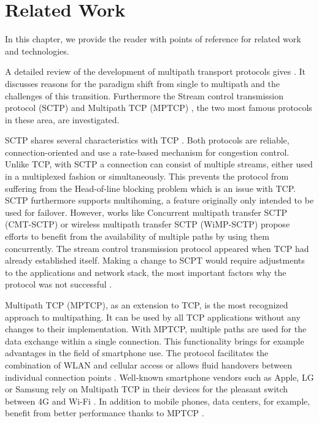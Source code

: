 \chapter{Related Work}
\label{chap:RelatedWork}

In this chapter, we provide the reader with points of reference for related work and technologies. %

A detailed review of the development of multipath transport protocols gives \cite{MultiPathSurvey}. It discusses reasons for the paradigm shift from single to multipath and the challenges of this transition. Furthermore the Stream control transmission protocol (SCTP) \cite{SCTPWiki, rfc4960} and Multipath TCP (MPTCP) \cite{Barre2011, Raiciu2012, MPTCPWebMain,rfc6824}, the two most famous protocols in these area, are investigated.

SCTP shares several characteristics with TCP \cite{rfc793}. Both protocols are reliable, connection-oriented and use a rate-based mechanism for congestion control. Unlike TCP, with SCTP a connection can consist of multiple streams, either used in a multiplexed fashion or simultaneously. This prevents the protocol from suffering from the Head-of-line blocking problem \cite{HOLBlocking} which is an issue with TCP. SCTP furthermore supports multihoming, a feature originally only intended to be used for failover. However, works like Concurrent multipath transfer SCTP (CMT-SCTP) \cite{1709949} or wireless multipath transfer SCTP (WiMP-SCTP) \cite{8205908} propose efforts to benefit from the availability of multiple paths by using them concurrently. The stream control transmission protocol appeared when TCP had already established itself. Making a change to SCPT would require adjustments to the applications and network stack, the most important factors why the protocol was not successful \cite{WhyNotSCTP}.

Multipath TCP (MPTCP), as an extension to TCP, is the most recognized approach to multipathing. It can be used by all TCP applications without any changes to their implementation. With MPTCP, multiple paths are used for the data exchange within a single connection. This functionality brings for example advantages in the field of smartphone use. The protocol facilitates the combination of WLAN and cellular access \cite{MPTCPStudyWirelessAndCellular} or allows fluid handovers between individual connection points \cite{MPTCPStudyHandover}. Well-known smartphone vendors such as Apple, LG or Samsung rely on Multipath TCP in their devices for the pleasant switch between 4G and Wi-Fi \cite{MPTCPInSmartphones}. In addition to mobile phones, data centers, for example, benefit from better performance thanks to MPTCP \cite{RBPGWH11}.

